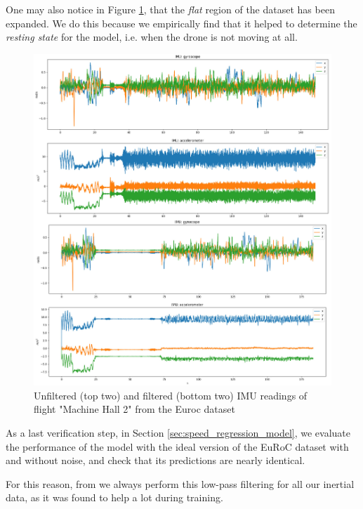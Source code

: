 One may also notice in Figure \ref{fig:filtEuroc}, that the \emph{flat} region of the dataset has been expanded. 
We do this because we empirically find that it helped to determine the \emph{resting state} for the model, i.e. when the drone is not moving at all. 
\begin{figure}
    \centering
    \includegraphics[width=\textwidth,height=\textheight,keepaspectratio]{thesis_template/img/euroc_imu_filtering.jpg} 
    \caption{Unfiltered (top two) and filtered (bottom two) IMU readings of flight "Machine Hall 2" from the Euroc dataset}
    \label{fig:filtEuroc}
\end{figure}

As a last verification step, in Section \ref{sec:speed_regression_model}, we evaluate the performance of the model with the ideal version of the EuRoC dataset with and without noise, and check that its predictions are nearly identical.

For this reason, from we always perform this low-pass filtering for all our inertial data, as it was found to help a lot during training.

\cleardoublepage